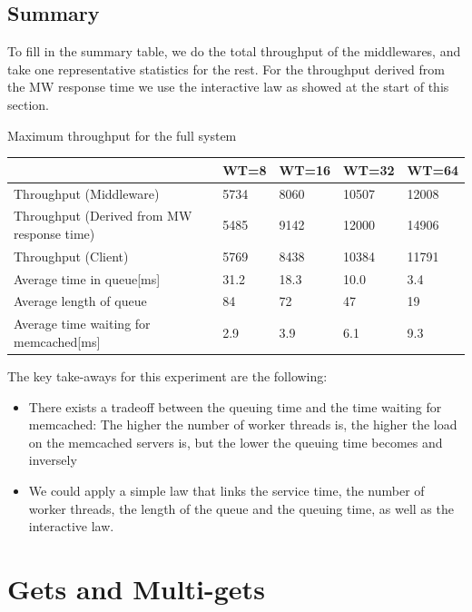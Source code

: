 \documentclass[11pt,a4paper]{article}
\begin{document}
\subsection{Summary}
To fill in the summary table, we do the total throughput of the middlewares, and take one representative statistics for the rest. For the throughput derived from the MW response time we use the interactive law as showed at the start of this section. 
\begin{center}
	{Maximum throughput for the full system}
	\begin{tabular}{|l|p{1.5cm}|p{1.5cm}|p{1.5cm}|p{1.5cm}|}
		\hline                                            & WT=8 & WT=16 & WT=32 & WT=64 \\ 
		\hline Throughput (Middleware)                    &5734      &8060       &10507       &12008       \\ 
		\hline Throughput (Derived from MW response time) &5485      &9142       &12000       &14906       \\ 
		\hline Throughput (Client)                        &5769      &8438       &10384       &11791       \\ 
		\hline Average time in queue[ms]                      &31.2      &18.3       &10.0      &3.4       \\ 
		\hline Average length of queue                    &84      &72       &47       &19       \\ 
		\hline Average time waiting for memcached[ms]         &2.9      &3.9       &6.1       &9.3       \\ 
		\hline 
	\end{tabular}
\end{center}

The key take-aways for this experiment are the following: 
\begin{itemize}
\item There exists a tradeoff between the queuing time and the time waiting for memcached: The higher the number of worker threads is, the higher the load on the memcached servers is, but the lower the queuing time becomes and inversely
\item We could apply a simple law that links the service time, the number of worker threads, the length of the queue and the queuing time, as well as the interactive law. 
\end{itemize}
\newpage

\section{Gets and Multi-gets}
\end{document}
